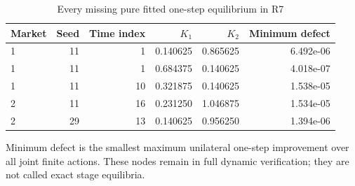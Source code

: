 \begin{table}[htbp]\centering
\caption{Every missing pure fitted one-step equilibrium in R7}
\begin{small}\begin{tabular}{lrrrrr}
\toprule
Market & Seed & Time index & $K_1$ & $K_2$ & Minimum defect \\
\midrule
1 & 11 & 1 & 0.140625 & 0.865625 & 6.492e-06 \\
1 & 11 & 1 & 0.684375 & 0.140625 & 4.018e-07 \\
1 & 11 & 10 & 0.321875 & 0.140625 & 1.538e-05 \\
2 & 11 & 16 & 0.231250 & 1.046875 & 1.534e-05 \\
2 & 29 & 13 & 0.140625 & 0.956250 & 1.394e-06 \\
\bottomrule\end{tabular}\end{small}
\par\smallskip\begin{minipage}{.96\linewidth}\footnotesize Minimum defect is the smallest maximum unilateral one-step improvement over all joint finite actions. These nodes remain in full dynamic verification; they are not called exact stage equilibria.\end{minipage}
\end{table}
